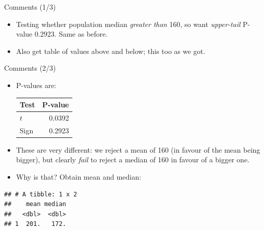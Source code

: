 \documentclass[ignorenonframetext,]{beamer}
\newenvironment{Shaded}{\begin{snugshade}}{\end{snugshade}}
\newcommand{\DataTypeTok}[1]{\textcolor[rgb]{0.13,0.29,0.53}{#1}}
\newcommand{\KeywordTok}[1]{\textcolor[rgb]{0.13,0.29,0.53}{\textbf{#1}}}
\newcommand{\NormalTok}[1]{#1}
\newcommand{\OperatorTok}[1]{\textcolor[rgb]{0.81,0.36,0.00}{\textbf{#1}}}
\newcommand{\StringTok}[1]{\textcolor[rgb]{0.31,0.60,0.02}{#1}}
\providecommand{\tightlist}{%
  \setlength{\itemsep}{0pt}\setlength{\parskip}{0pt}}
\begin{document}
\begin{frame}{Comments (1/3)}
\protect\hypertarget{comments-13}{}

\begin{itemize}
\tightlist
\item
  Testing whether population median \emph{greater than} 160, so want
  \emph{upper-tail} P-value 0.2923. Same as before.
\item
  Also get table of values above and below; this too as we got.
\end{itemize}

\end{frame}

\begin{frame}[fragile]{Comments (2/3)}
\protect\hypertarget{comments-23}{}

\begin{itemize}
\tightlist
\item
  P-values are:

  \begin{center}
    \begin{tabular}{lr}
      Test & P-value\\
      \hline
      $t$ & 0.0392\\
      Sign & 0.2923\\
      \hline
    \end{tabular}

    \end{center}
\item
  These are very different: we reject a mean of 160 (in favour of the
  mean being bigger), but clearly \emph{fail} to reject a median of 160
  in favour of a bigger one.
\item
  Why is that? Obtain mean and median:
\end{itemize}

\begin{Shaded}
\end{Shaded}

\begin{verbatim}
## # A tibble: 1 x 2
##    mean median
##   <dbl>  <dbl>
## 1  201.   172.
\end{verbatim}

\end{frame}
\end{document}
